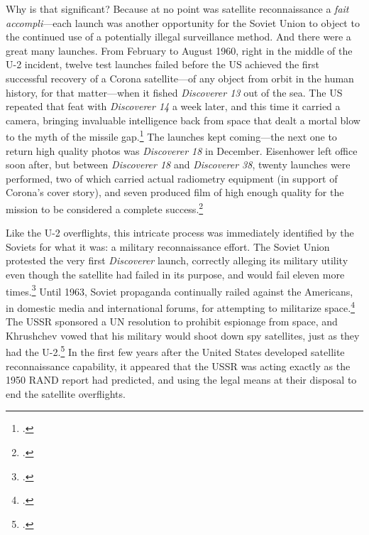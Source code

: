 \documentclass[14pt]{extarticle}
\begin{document}
Why is that significant? Because at no point was satellite reconnaissance a \emph{fait accompli}---each launch was another opportunity for the Soviet Union to object to the continued use of a potentially illegal surveillance method. And there were a great many launches. From February to August 1960, right in the middle of the U-2 incident, twelve test launches failed before the US achieved the first successful recovery of a Corona satellite---of any object from orbit in the human history, for that matter---when it fished \emph{Discoverer 13} out of the sea. The US repeated that feat with \emph{Discoverer 14} a week later, and this time it carried a camera, bringing invaluable intelligence back from space that dealt a mortal blow to the myth of the missile gap.\footcite[p.~101-102. The previous failures had been so demoralizing that \emph{Discoverer 13} only carried diagnostic equipment, which made its success all the more exciting. Ships on standby were able to retrieve the satellite even though it fell outside the recovery zone---\emph{Discoverer 13} many not have landed in the ballpark or the outfield, but in many respects, the mission was a home run.]{lindgren_trust_2000} The launches kept coming---the next one to return high quality photos was \emph{Discoverer 18} in December. Eisenhower left office soon after, but between \emph{Discoverer 18} and \emph{Discoverer 38}, twenty launches were performed, two of which carried actual radiometry equipment (in support of Corona's cover story), and seven produced film of high enough quality for the mission to be considered a complete success.\footcite[p.~103]{lindgren_trust_2000}

Like the U-2 overflights, this intricate process was immediately identified by the Soviets for what it was: a military reconnaissance effort. The Soviet Union protested the very first \emph{Discoverer} launch, correctly alleging its military utility even though the satellite had failed in its purpose, and would fail eleven more times.\footcite[p.~140]{day_eye_2015} Until 1963, Soviet propaganda continually railed against the Americans, in domestic media and international forums, for attempting to militarize space.\footcite[p.~271]{mcdougall_heavens_1985} The USSR sponsored a UN resolution to prohibit espionage from space, and Khrushchev vowed that his military would shoot down spy satellites, just as they had the U-2.\footcite[p.~166]{day_eye_2015} In the first few years after the United States developed satellite reconnaissance capability, it appeared that the USSR was acting exactly as the 1950 RAND report had predicted, and using the legal means at their disposal to end the satellite overflights.
\end{document}
